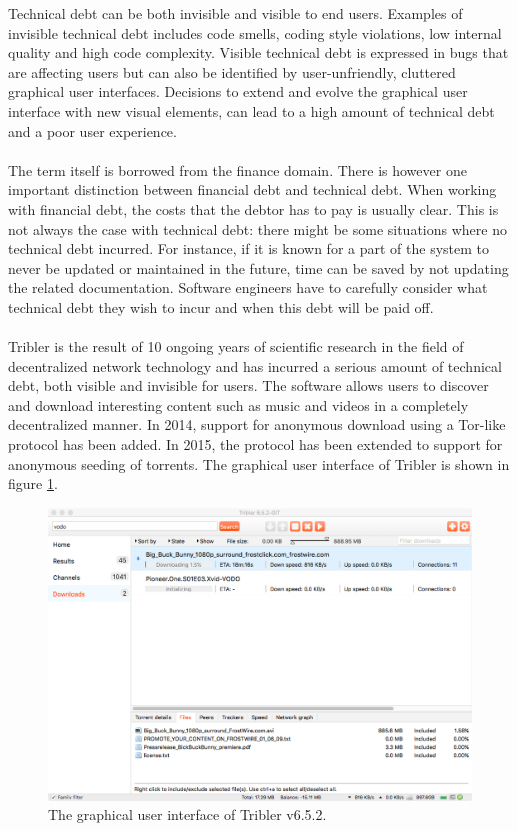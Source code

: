 Technical debt can be both invisible and visible to end users.
Examples of invisible technical debt includes code smells, coding style violations, low internal quality and high code complexity.
Visible technical debt is expressed in bugs that are affecting users but can also be identified by user-unfriendly, cluttered graphical user interfaces.
Decisions to extend and evolve the graphical user interface with new visual elements, can lead to a high amount of technical debt and a poor user experience.\\\\
The term itself is borrowed from the finance domain.
There is however one important distinction between financial debt and technical debt.
When working with financial debt, the costs that the debtor has to pay is usually clear.
This is not always the case with technical debt: there might be some situations where no technical debt incurred.
For instance, if it is known for a part of the system to never be updated or maintained in the future, time can be saved by not updating the related documentation.
Software engineers have to carefully consider what technical debt they wish to incur and when this debt will be paid off.\\\\
Tribler is the result of 10 ongoing years of scientific research in the field of decentralized network technology and has incurred a serious amount of technical debt, both visible and invisible for users.
The software allows users to discover and download interesting content such as music and videos in a completely decentralized manner.
In 2014, support for anonymous download using a Tor-like protocol has been added. 
In 2015, the protocol has been extended to support for anonymous seeding of torrents.
The graphical user interface of Tribler is shown in figure \ref{fig:tribler-interface}.

\begin{figure}[!h]
	\centering
	\includegraphics[width=0.9\columnwidth]{images/tribler_interface}
	\caption{The graphical user interface of Tribler v6.5.2.}
	\label{fig:tribler-interface}
\end{figure}

